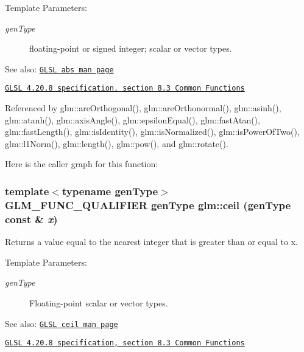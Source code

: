 \begin{Desc}
\item[Template Parameters:]
\begin{description}
\item[{\em genType}]floating-point or signed integer; scalar or vector types.\end{description}
\end{Desc}
\begin{Desc}
\item[See also:]\href{http://www.opengl.org/sdk/docs/manglsl/xhtml/abs.xml}{\tt GLSL abs man page} 

\href{http://www.opengl.org/registry/doc/GLSLangSpec.4.20.8.pdf}{\tt GLSL 4.20.8 specification, section 8.3 Common Functions} \end{Desc}


Referenced by glm::areOrthogonal(), glm::areOrthonormal(), glm::asinh(), glm::atanh(), glm::axisAngle(), glm::epsilonEqual(), glm::fastAtan(), glm::fastLength(), glm::isIdentity(), glm::isNormalized(), glm::isPowerOfTwo(), glm::l1Norm(), glm::length(), glm::pow(), and glm::rotate().

Here is the caller graph for this function:\hypertarget{group__core__func__common_g18be34b68c7f647b4455bafe4c7d7ecd}{
\subsubsection[ceil]{\setlength{\rightskip}{0pt plus 5cm}template$<$typename genType$>$ GLM\_\-FUNC\_\-QUALIFIER genType glm::ceil (genType const \& {\em x})}}
\label{group__core__func__common_g18be34b68c7f647b4455bafe4c7d7ecd}


Returns a value equal to the nearest integer that is greater than or equal to x.

\begin{Desc}
\item[Template Parameters:]
\begin{description}
\item[{\em genType}]Floating-point scalar or vector types.\end{description}
\end{Desc}
\begin{Desc}
\item[See also:]\href{http://www.opengl.org/sdk/docs/manglsl/xhtml/ceil.xml}{\tt GLSL ceil man page} 

\href{http://www.opengl.org/registry/doc/GLSLangSpec.4.20.8.pdf}{\tt GLSL 4.20.8 specification, section 8.3 Common Functions} \end{Desc}


